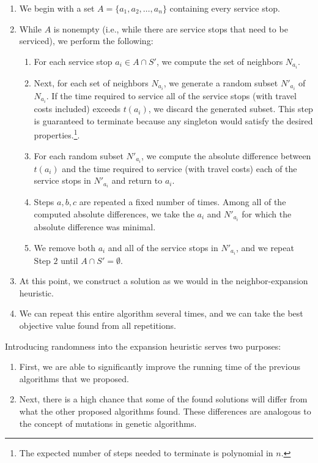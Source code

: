 \documentclass[12pt]{scrartcl}
\begin{document}
\begin{enumerate}
    \item We begin with a set $A = \{a_1, a_2, \ldots, a_n\}$ containing every service stop.
		\item While $A$ is nonempty (i.e., while there are service stops that need to be serviced), we perform the following:
    \begin{enumerate}
        \item For each service stop $a_i \in A \cap S'$, we compute the set of neighbors $N_{a_i}$.
        \item Next, for each set of neighbors $N_{a_i}$, we generate a random subset $N'_{a_i}$ of $N_{a_i}$. If the time required to service all of the service stops (with travel costs included) exceeds $t(a_i)$, we discard the generated subset. This step is guaranteed to terminate because any singleton would satisfy the desired properties.\footnote{The expected number of steps needed to terminate is polynomial in $n$.}. 
        \item For each random subset $N'_{a_i}$, we compute the absolute difference between $t(a_i)$ and the time required to service (with travel costs) each of the service stops in $N'_{a_i}$ and return to $a_i$.
        \item Steps $a, b, c$ are repeated a fixed number of times. Among all of the computed absolute differences, we take the $a_i$ and $N'_{a_i}$ for which the absolute difference was minimal. 
        \item We remove both $a_i$ and all of the service stops in $N'_{a_i}$, and we repeat Step $2$ until $A \cap S' = \emptyset$.
    \end{enumerate}
    \item At this point, we construct a solution as we would in the neighbor-expansion heuristic. 
    \item We can repeat this entire algorithm several times, and we can take the best objective value found from all repetitions. 
\end{enumerate}

Introducing randomness into the expansion heuristic serves two purposes:

\begin{enumerate}
    \item First, we are able to significantly improve the running time of the previous algorithms that we proposed.
    \item Next, there is a high chance that some of the found solutions will differ from what the other proposed algorithms found. These differences are analogous to the concept of mutations in genetic algorithms. 
\end{enumerate}
\end{document}
